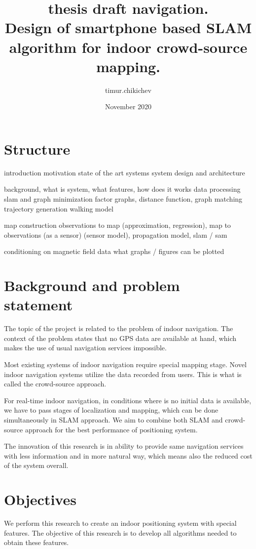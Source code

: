 \documentclass[a4paper, 12pt]{article}
\title{thesis draft navigation. \\
Design of smartphone based SLAM algorithm for indoor crowd-source mapping.
}
\author{timur.chikichev }
\date{November 2020}
\begin{document}
	

%	 

\section{Structure}

introduction
motivation
state of the art systems
system design and architecture

background, what is system, what features, how does it works
data processing
slam and graph minimization
factor graphs, distance function, graph matching
trajectory generation
walking model

map construction
observations to map (approximation, regression), map to observations (as a sensor)
(sensor model), propagation model, slam / sam

conditioning on magnetic field data
what graphs / figures can be plotted

\section{Background and problem statement}

The topic of the project is related to the problem of indoor navigation. The context of the problem states that no GPS data are available at hand, which makes the use of usual navigation services impossible.

Most existing systems of indoor navigation require special mapping stage. Novel indoor navigation systems utilize the data recorded from users. This is what is called the crowd-source approach.

For real-time indoor navigation, in conditions where is no initial data is available, we have to pass stages of localization and mapping, which can be done simultaneously in SLAM approach. We aim to combine both SLAM and crowd-source approach for the best performance of positioning system.

The innovation of this research is in ability to provide same navigation services with less information and in more natural way, which means also the reduced cost of the system overall.

\section{Objectives}
We perform this research to create an indoor positioning system with special features. The objective of this research is to develop all algorithms needed to obtain these features.
\end{document}
